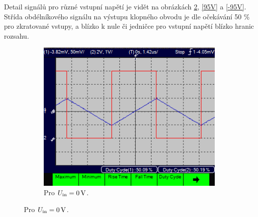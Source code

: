 \documentclass[twoside]{article}
\begin{document}
Detail signálů pro různé vstupní napětí je vidět na obrázkách 
\ref{0V}, \ref{95V} a \ref{-95V}.
Střída obdélníkového signálu na výstupu klopného obvodu je
dle očekávání 50 \% pro zkratované vstupy, a blízko k nule či jedničce
pro vstupní napětí blízko hranic rozsahu.


\begin{figure}
    \centering
    \begin{subfigure}{0.9\textwidth}
        
        \includegraphics[width=\textwidth]{0V.png}
        \caption{Pro $U_{\rm in} = \SI{0}{\volt}$.}
        \label{0V}
    \end{subfigure}


\end{figure}
\end{document}
